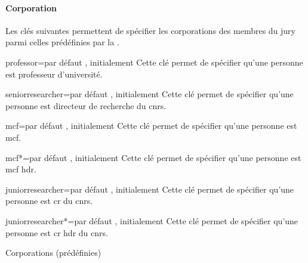 \paragraph{Corporation}
\label{sec:corporation}

Les clés suivantes\syntaxeoptions{} permettent de spécifier les corporations
des membres du jury parmi celles prédéfinies par la \yatcl{}.

\begin{docKey}{professor}{=\textbar{}}{par défaut
    , initialement }
  Cette clé permet de spécifier qu'une personne est professeur d'université.
\end{docKey}
%
\begin{docKey}{seniorresearcher}{=\textbar{}}{par défaut
    , initialement }
  Cette clé permet de spécifier qu'une personne est directeur de
  recherche du \gls{cnrs}.
\end{docKey}
%
\begin{docKey}{mcf}{=\textbar{}}{par défaut ,
    initialement }
  Cette clé permet de spécifier qu'une personne est \gls{mcf}.
\end{docKey}
%
\begin{docKey}{mcf*}{=\textbar{}}{par défaut ,
    initialement }
  Cette clé permet de spécifier qu'une personne est \gls{mcf} \gls{hdr}.
\end{docKey}
%
\begin{docKey}{juniorresearcher}{=\textbar{}}{par défaut
    , initialement }
  Cette clé permet de spécifier qu'une personne est \gls{cr} du \gls{cnrs}.
\end{docKey}
%
\begin{docKey}{juniorresearcher*}{=\textbar{}}{par défaut
    , initialement }
  Cette clé permet de spécifier qu'une personne est \gls{cr} \gls{hdr} du
  \gls{cnrs}.
\end{docKey}
%
\begin{dbexample}{Corporations (prédéfinies)}{}
\begin{bodycode}
%
%
\end{bodycode}
\end{dbexample}
